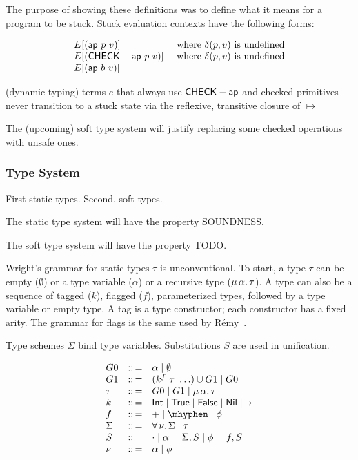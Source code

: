 \documentclass{article}
\begin{document}
The purpose of showing these definitions was to define what it means for a
 program to be stuck.
Stuck evaluation contexts have the following forms:

\[\begin{array}{l l}
   E[(\mathsf{ap}~p~v)] & \mbox{ where } \delta(p, v) \mbox{ is undefined}
\\ E[(\mathsf{CHECK-ap}~p~v)] & \mbox{ where } \delta(p, v) \mbox{ is undefined}
\\ E[(\mathsf{ap}~b~v)]
  \end{array}\]

\begin{proposition}
(dynamic typing) terms $e$ that always use $\mathsf{CHECK-ap}$ and checked primitives never
 transition to a stuck state via the reflexive, transitive closure of $\mapsto$
\end{proposition}

The (upcoming) soft type system will justify replacing some checked operations
 with unsafe ones.


\subsubsection*{Type System}

First static types.
Second, soft types.

The static type system will have the property SOUNDNESS.

The soft type system will have the property TODO.


Wright's grammar for static types $\tau$ is unconventional.
To start, a type $\tau$ can be empty ($\emptyset$) or a type variable ($\alpha$)
 or a recursive type ($\mu\,\alpha.\,\tau$).
A type can also be a sequence of tagged ($k$), flagged ($f$), parameterized
 types, followed by a type variable or empty type.
A tag is a type constructor; each constructor has a fixed arity.
The grammar for flags is the same used by R\'{e}my~\cite{r-popl-1989}.

Type schemes $\Sigma$ bind type variables.
Substitutions $S$ are used in unification.

\[\begin{array}{l c l}
   G0 & \coloneq & \alpha \mid \emptyset
\\ G1 & \coloneq & (k^f~\tau~\ldots) \cup G1 \mid G0
\\ \tau & \coloneq & G0 \mid G1 \mid \trec{\alpha}{\tau}
\\ k & \coloneq & \tint \mid \ttrue \mid \tfalse \mid \tnil \mid \rightarrow
\\ f & \coloneq & + \mid \mhyphen \mid \phi
\\ \Sigma & \coloneq & \tall{\nu}{\Sigma} \mid \tau
\\ S & \coloneq & \cdot \mid \alpha = \Sigma,S \mid \phi = f, S
\\ \nu & \coloneq & \alpha \mid \phi
  \end{array}\]
\end{document}
